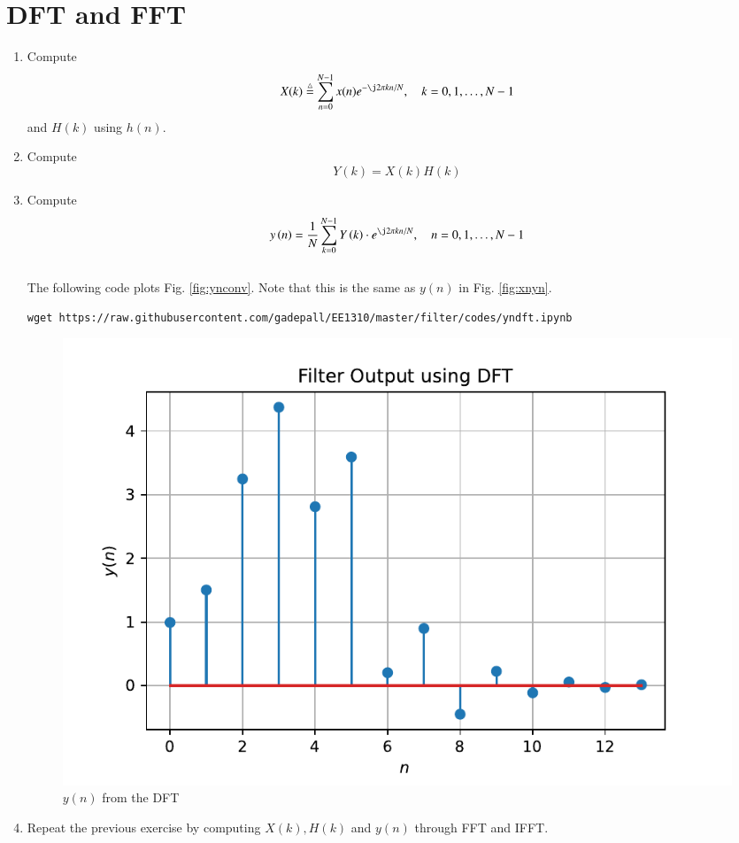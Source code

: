 \documentclass[journal,12pt,twocolumn]{IEEEtran}
\renewcommand\thesection{\arabic{section}}
\begin{document}
\section{DFT and FFT}
\begin{enumerate}[label=\thesection.\arabic*]
\item
Compute
\begin{equation}
X(k) \define \sum _{n=0}^{N-1}x(n) e^{-\j2\pi kn/N}, \quad k = 0,1,\dots, N-1
\end{equation}
and $H(k)$ using $h(n)$.
\item Compute 
\begin{equation}
Y(k) = X(k)H(k)
\end{equation}
\item Compute
\begin{equation}
 y\brak{n}={\frac {1}{N}}\sum _{k=0}^{N-1}Y\brak{k}\cdot e^{\j 2\pi kn/N},\quad n = 0,1,\dots, N-1
\end{equation}
\\
\solution The following code plots Fig. \ref{fig:ynconv}. Note that this is the same as 
$y(n)$ in  Fig. 
\ref{fig:xnyn}. 
%
\begin{lstlisting}
wget https://raw.githubusercontent.com/gadepall/EE1310/master/filter/codes/yndft.ipynb
\end{lstlisting}
\begin{figure}[!ht]
\centering
\includegraphics[width=\columnwidth]{./figs/yndft}
\caption{$y(n)$ from the DFT}
\label{fig:yndft}
\end{figure}
\item Repeat the previous exercise by computing $X(k), H(k)$ and $y(n)$ through FFT and 
IFFT.

\end{enumerate}
%
\end{document}
